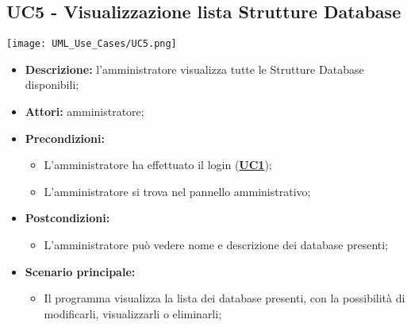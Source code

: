 \subsection{UC5 - Visualizzazione lista Strutture Database}
\label{sec:UC5}
\texttt{[image: UML\_Use\_Cases/UC5.png]}
\begin{itemize}
	\item \textbf{Descrizione:} l’amministratore visualizza tutte le Strutture Database disponibili;
	\item \textbf{Attori:} amministratore;
	\item \textbf{Precondizioni:} 
	\begin{itemize}
		\item L’amministratore ha effettuato il login (\hyperref[sec:UC1]{\textbf{UC1}});
		\item L’amministratore si trova nel pannello amministrativo;
	\end{itemize}
	\item \textbf{Postcondizioni:} 
	\begin{itemize}
		\item L'amministratore può vedere nome e descrizione dei database presenti;
	\end{itemize}
	\item \textbf{Scenario principale:} 
	\begin{itemize}
		\item Il programma visualizza la lista dei database presenti, con la possibilità di modificarli, visualizzarli o eliminarli;
	\end{itemize}
\end{itemize}

